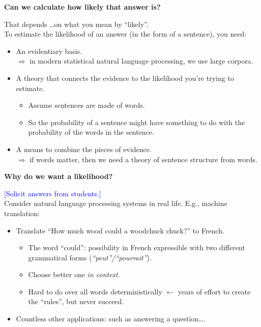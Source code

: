 \documentclass{beamer}
\newcommand{\pagestepalt}[2]{
  \begin{frame}[t]
    \begin{minipage}[t][0.26\textheight][t]{\textwidth}
      \begin{center}
        \huge
        \textbf{#1}
      \end{center}
    \end{minipage}
    
    \begin{minipage}[t][0.7\textheight][t]{\textwidth}
      #2
    \end{minipage}
  \end{frame}
}
\begin{document}
\pagestepalt{Can we calculate how \alert{likely} that answer is?}{
  \pause That depends \ldots on what you mean by ``likely''.\pause\\ To
  estimate the likelihood of an answer (in the form of a sentence),
  you need:
  \begin{itemize}
  \item An evidentiary basis.
    \\$\Rightarrow$ in modern \alert{statistical} natural language processing,
    we use large \alert{corpora}. \pause 
  \item A theory that connects the evidence to the likelihood you're
    trying to estimate.  \pause
    \begin{itemize}
    \item Assume sentences are made of words.  
    \item So the probability of a sentence might have something 
      to do with the probability of the words in the sentence.
    \end{itemize}\pause
  \item A means to combine the pieces of evidence.\\
    $\Rightarrow$ if words matter, then we need a \alert{theory} of sentence
    structure from words.
  \end{itemize}
}

\pagestepalt{Why do we want a likelihood?}{
  \textcolor{blue}{[Solicit answers from students.]}\\ \pause
  Consider natural language processing systems in real life. E.g., machine 
  translation:
  \begin{itemize}
  \item Translate ``How much wood \alert{could} a woodchuck chuck?'' to French.
    \begin{itemize}
    \item The word ``could'': possibility in French expressible with 
      two different grammatical forms ({\it ``peut''/``pourrait''}).
    \item Choose better one {\it in context}.
    \item Hard to do over all words deterministically $\leftarrow$
      years of effort to create the ``rules'', but never succeed.
    \end{itemize}
  \item Countless other applications: such as answering a question\ldots.
  \end{itemize}
}
\end{document}
